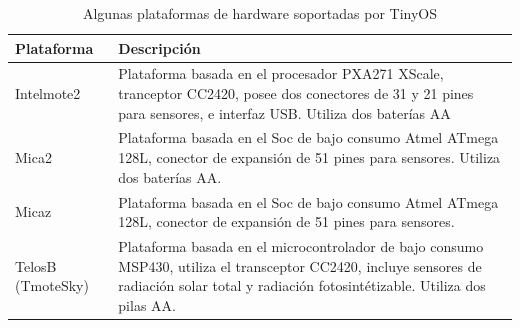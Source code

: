 \begin{center}
\begin{table}[H]
\caption{Algunas plataformas de hardware soportadas por TinyOS} 
\begin{tabular}{|l|p{10cm}|}
\hline \textbf{Plataforma} & \textbf{Descripción} \\ 

\hline Intelmote2 \cite{IntelMote2Web} &  Plataforma basada en el procesador PXA271 XScale, tranceptor CC2420, posee dos conectores de 31 y 21 pines para sensores,  e interfaz USB. Utiliza dos baterías AA\\ 


\hline Mica2 \cite{Mica2Datasheet} &  Plataforma basada en el Soc de bajo consumo Atmel ATmega 128L, conector de expansión de 51 pines para sensores. Utiliza dos baterías AA. \\ 

\hline Micaz \cite{MicazDatasheet} &  Plataforma basada en el Soc de bajo consumo Atmel ATmega 128L, conector de expansión de 51 pines para sensores. \\ 


\hline TelosB (TmoteSky) \cite{TelosBDatasheet} & Plataforma basada en el microcontrolador de bajo consumo MSP430, utiliza el transceptor CC2420, incluye sensores de radiación solar total y radiación fotosintétizable. Utiliza dos pilas AA.  \\ 

\hline 

\end{tabular}

\end{table} 
\end{center}


